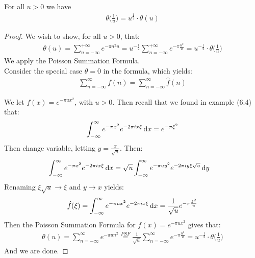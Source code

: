 \begin{proposition}
For all $u > 0$ we have
\begin{align*}
    \theta\big(\tfrac{1}{u}\big) = u^{\frac{1}{2}} \cdot \theta(u)
\end{align*}
\end{proposition}

\begin{proof}
We wish to show, for all $u>0$, that:
\begin{align*}
    \theta(u) = \sum_{n=-\infty}^{+\infty} e^{- \pi n^2 u} = u^{- \frac{1}{2}} \sum_{n=-\infty}^{+\infty} e^{- \pi \frac{n^2}{u}} = u^{- \frac{1}{2}} \cdot  \theta\big(\tfrac{1}{u}\big)
\end{align*}
We apply the Poisson Summation Formula.\\


Consider the special case $\theta = 0$ in the formula, which yields:
\begin{align*}
    \sum_{n=-\infty}^\infty f( n) = \sum_{n=-\infty}^\infty \hat{f}(n)
\end{align*}

We let $f(x) = e^{-\pi u x^2}$, with $u>0$. Then recall that we found in example (6.4) that:
\begin{align*}
    \int_{-\infty}^\infty e^{-\pi x^2} e^{-2\pi i x \xi}  \dif x = e^{-\pi \xi ^2 }
\end{align*}
Then change variable, letting $y = \frac{x}{\sqrt{u}}$. Then:
\begin{align*}
    \int_{-\infty}^\infty e^{-\pi x^2} e^{-2\pi i x \xi}  \dif x &= \sqrt{u} \int_{-\infty}^\infty e^{-\pi u y^2} e^{-2\pi i y \xi \sqrt{u}}  \dif y
\end{align*}
Renaming $\xi \sqrt{u} \xrightarrow{} \xi$ and $y \xrightarrow{} x$ yields:
\begin{align*}
    \hat{f}(\xi)=\int_{-\infty}^\infty e^{-\pi u x^2} e^{-2\pi i x \xi}  \dif x = \frac{1}{\sqrt{u}} e^{- \pi \frac{\xi^2}{u}} 
\end{align*}
Then the Poisson Summation Formula for $f(x) = e^{- \pi u x^2}$ gives that:
\begin{align*}
    \theta(u) = \sum_{n=-\infty}^\infty e^{- \pi u n^2} \overset{PSF}{=} \frac{1}{\sqrt{u} } \sum_{n=-\infty}^\infty e^{- \pi \frac{n^2}{u}} = u^{- \frac{1}{2}} \cdot  \theta\big(\tfrac{1}{u}\big)
\end{align*}
And we are done.

\end{proof}







